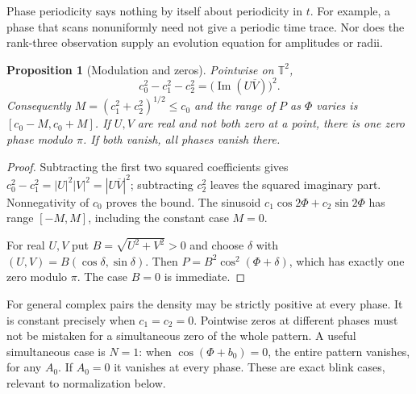 \documentclass[11pt,a4paper]{article}
\newtheorem{proposition}[theorem]{Proposition}
\theoremstyle{definition}
\theoremstyle{remark}
\newcommand{\T}{\mathbb T}
\newcommand{\Ima}{\operatorname{Im}}
\begin{document}
Phase periodicity says nothing by itself about periodicity in
$t$. For example, a phase that scans nonuniformly need not
give a periodic time trace. Nor does the rank-three observation
supply an evolution equation for amplitudes or radii.

\begin{proposition}[Modulation and zeros]
\label{prop:modulation}
Pointwise on $\T^2$,
\begin{equation}
 c_0^2-c_1^2-c_2^2=\bigl(\Ima(U\overline V)\bigr)^2.
 \label{eq:modulation}
\end{equation}
Consequently $M=(c_1^2+c_2^2)^{1/2}\leq c_0$ and the range of
$P$ as $\Phi$ varies is $[c_0-M,c_0+M]$. If $U,V$ are real
and not both zero at a point, there is one zero phase modulo
$\pi$. If both vanish, all phases vanish there.
\end{proposition}
\begin{proof}
Subtracting the first two squared coefficients gives
$c_0^2-c_1^2=|U|^2|V|^2=|U\overline V|^2$; subtracting
$c_2^2$ leaves the squared imaginary part. Nonnegativity of
$c_0$ proves the bound. The sinusoid
$c_1\cos2\Phi+c_2\sin2\Phi$ has range $[-M,M]$, including
the constant case $M=0$.

For real $U,V$ put $B=\sqrt{U^2+V^2}>0$ and choose
$\delta$ with $(U,V)=B(\cos\delta,\sin\delta)$. Then
$P=B^2\cos^2(\Phi+\delta)$, which has exactly one zero
modulo $\pi$. The case $B=0$ is immediate.
\end{proof}

For general complex pairs the density may be strictly positive
at every phase. It is constant precisely when $c_1=c_2=0$.
Pointwise zeros at different phases must not be mistaken for
a simultaneous zero of the whole pattern. A useful simultaneous
case is $N=1$: when $\cos(\Phi+b_0)=0$, the entire pattern
vanishes, for any $A_0$. If $A_0=0$ it vanishes at every phase.
These are exact blink cases, relevant to normalization below.
\end{document}
